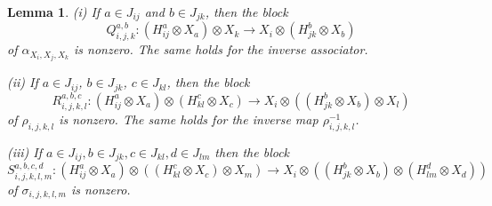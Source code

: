 \documentclass[12pt]{amsart}
\numberwithin{equation}{section}
\newtheorem{lemma}[theorem]{Lemma}
\theoremstyle{definition}
\newcommand{\1}{_{(1)}}
\newcommand{\2}{_{(2)}}
\newcommand{\3}{_{(3)}}
\newcommand{\4}{_{(4)}}
\newcommand{\5}{_{(5)}}
\newcommand{\6}{_{(6)}}
\theoremstyle{plain}
\theoremstyle{definition}
\theoremstyle{remark}
\begin{document}
\begin{lemma}
\label{lem:block-nonvanishing-final}
(i) If \(a\in J_{ij}\) and \(b\in J_{jk}\), then the block
\begin{equation*}
        Q^{a,b}_{i,j,k}:
        (H^a_{ij}\otimes X_a)\otimes X_k
        \longrightarrow
        X_i\otimes(H^b_{jk}\otimes X_b)
\end{equation*}
of \(\alpha_{X_i,X_j,X_k}\) is nonzero.  The same holds for the inverse
associator.

(ii) If \(a\in J_{ij}\), \(b\in J_{jk}\), \(c\in J_{kl}\), then the block
\begin{equation*}
        R_{i,j,k,l}^{a,b,c}:
        (H^a_{ij}\otimes X_a)\otimes(H^c_{kl}\otimes X_c)
        \longrightarrow
        X_i\otimes((H^b_{jk}\otimes X_b)\otimes X_l)
\end{equation*}
of \(\rho_{i,j,k,l}\) is nonzero.  The same holds for the inverse map
\(\rho^{-1}_{i,j,k,l}\).

(iii) If $a\in J_{ij},b\in J_{jk},
        c\in J_{kl},d\in J_{lm}$
then the block
\begin{equation*}
        S_{i,j,k,l,m}^{a,b,c,d}:
        (H^a_{ij}\otimes X_a)\otimes((H^c_{kl}\otimes X_c)\otimes X_m)
        \longrightarrow
        X_i\otimes((H^b_{jk}\otimes X_b)\otimes(H^d_{lm}\otimes X_d))
\end{equation*}
of \(\sigma_{i,j,k,l,m}\) is nonzero.
\end{lemma}
\end{document}
